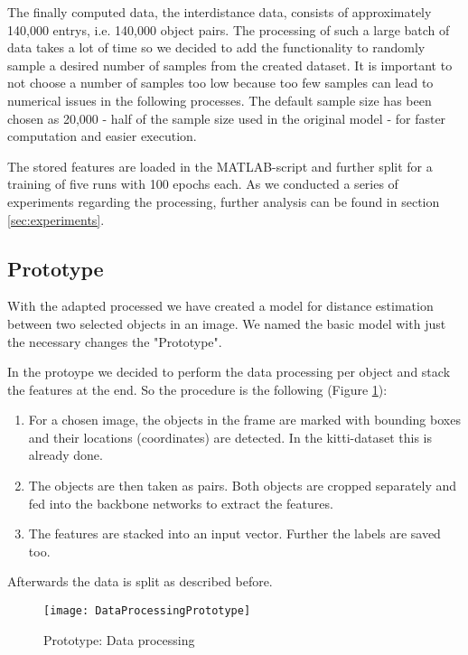 \documentclass[a4paper, 11pt]{article}
\begin{document}
\begin{multicols}{2}
\begin{flushleft}
The finally computed data, the interdistance data, consists of approximately 140,000 entrys, i.e. 140,000 object pairs. The processing of such a large batch of data takes a lot of time so we decided to add the functionality to randomly sample a desired number of samples from the created dataset. It is important to not choose a number of samples too low because too few samples can lead to numerical issues in the following processes. The default sample size has been chosen as 20,000 - half of the sample size used in the original model - for faster computation and easier execution.

The stored features are loaded in the MATLAB-script and further split for a training of five runs with 100 epochs each. As we conducted a series of experiments regarding the processing, further analysis can be found in section \ref{sec:experiments}.
\end{flushleft}

\subsection{Prototype}
\begin{flushleft}
With the adapted processed we have created a model for distance estimation between two selected objects in an image. We named the basic model with just the necessary changes the "Prototype".

In the protoype we decided to perform the data processing per object and stack the features at the end. So the procedure is the following (Figure \ref{fig:data_proc_proto}):
\begin{enumerate}
\item For a chosen image, the objects in the frame are marked with bounding boxes and their locations (coordinates) are detected. In the kitti-dataset this is already done.
\item The objects are then taken as pairs. Both objects are cropped separately and fed into the backbone networks to extract the features.
\item The features are stacked into an input vector. Further the labels are saved too.
\end{enumerate}
Afterwards the data is split as described before.
\begin{figure}[H]
\centering
\texttt{[image: DataProcessingPrototype]}
\caption{Prototype: Data processing}
\label{fig:data_proc_proto}
\end{figure}
\end{flushleft}


\end{multicols}
\end{document}
